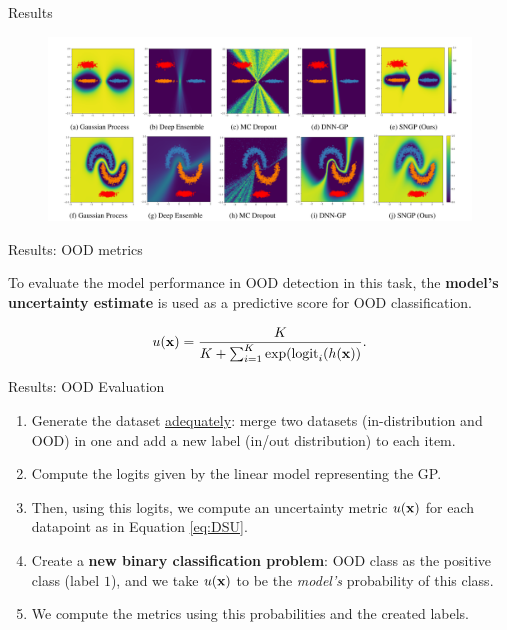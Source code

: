 \documentclass[xcolor=table]{beamer}
\begin{document}
\begin{frame}{Results}
    \begin{figure}
        \centering
        \includegraphics[scale=0.15]{fig/SNGP_results.png}
        \label{fig:results}
    \end{figure}
\end{frame}

\begin{frame}{Results: OOD metrics}

To evaluate the model performance in OOD detection in this task, the \textbf{model's uncertainty estimate} is used as a predictive score for OOD classification. 

\begin{equation} \label{eq:DSU}
u({\mathbf x}) = \frac{K}{K + \sum_{i=1}^K \exp(\text{logit}_i(h({\mathbf x}))}.
\end{equation}

    
\end{frame}


\begin{frame}{Results: OOD Evaluation}
    \begin{enumerate}
    \item Generate the dataset \href{https://github.com/google/uncertainty-baselines/blob/9cef4b58b8b8bc9b3b3478ed364e30fd7bbe5a25/uncertainty_baselines/datasets/base.py}{adequately}: merge two datasets (in-distribution and OOD) in one and add a new label (in/out distribution) to each item.
    \item Compute the logits given by the linear model representing the GP.
    \item Then, using this logits, we compute an uncertainty metric \(u({\mathbf x})\) for each datapoint as in Equation \eqref{eq:DSU}.
    \item Create a \textbf{new binary classification problem}:  OOD class as the positive class (label \(1\)), and we take \(u({\mathbf x})\) to be the \emph{model's} probability of this class.
    \item We compute the metrics using this probabilities and the created labels.
\end{enumerate}
\end{frame}
\end{document}
